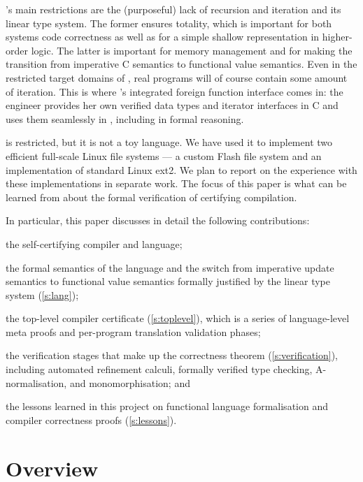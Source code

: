 \documentclass[9pt\ifFinal\else,preprint,nocopyrightspace\fi,\ifAlpha\else natbib,authoryear\fi]{sigplanconf}
\begin{document}
\CDSL's main restrictions are the (purposeful) lack of recursion and
iteration and its linear type system. The former ensures totality,
which is important for both systems code correctness as well as for a simple
shallow representation in higher-order logic. The latter is important for
memory management and for making the transition from imperative C semantics
to functional value semantics. Even in the restricted target domains of
\CDSL, real programs will of course contain some amount of iteration. 
This is
where \CDSL's integrated foreign function interface comes in: the engineer 
provides her own verified data types and
iterator interfaces in C and uses them seamlessly in \CDSL, including in
formal reasoning.

\CDSL is restricted, but it is not a toy language. We have used it to
implement two efficient full-scale Linux file systems --- a custom Flash file system
and an implementation of standard Linux ext2. We plan to report on the experience with these implementations in
separate work. The focus of this paper is what can be learned 
from \CDSL about the formal verification of certifying compilation.

In particular, this paper discusses in detail the following contributions:
\begin{inparaenum}[a)]
\item the self-certifying \CDSL compiler and language;
\item the formal semantics of the \CDSL language and the switch from
imperative update semantics to functional value semantics formally justified
by the linear type system (\autoref{s:lang});
\item the top-level compiler certificate (\autoref{s:toplevel}), which is a series of language-level
meta proofs and per-program translation validation phases;
\item the verification stages that make up the correctness theorem (\autoref{s:verification}), including
automated refinement calculi, formally verified type checking, A-normalisation, and monomorphisation; and
\item the lessons learned in this project on functional language formalisation and
compiler correctness proofs (\autoref{s:lessons}).
\end{inparaenum}


\section{Overview}\label{s:overview}
\end{document}
